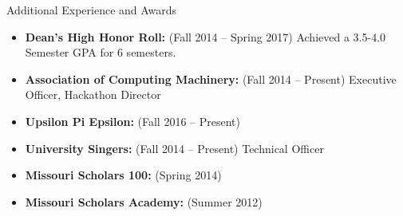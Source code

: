 \documentclass[]{mcdowellcv}
\begin{document}
    \begin{cvsection}{Additional Experience and Awards}
        \begin{cvsubsection}{}{}{}	
            \begin{itemize}
                \item \textbf{Dean's High Honor Roll:}  (Fall 2014 -- Spring 2017) Achieved a 3.5-4.0 Semester GPA for 6 semesters.
                \item \textbf{Association of Computing Machinery:} (Fall 2014 -- Present) Executive Officer, Hackathon Director
                \item \textbf{Upsilon Pi Epsilon:}  (Fall 2016 -- Present)
                \item \textbf{University Singers:} (Fall 2014 -- Present) Technical Officer
                \item \textbf{Missouri Scholars 100:} (Spring 2014)
                \item \textbf{Missouri Scholars Academy:} (Summer 2012)
            \end{itemize}
        \end{cvsubsection}
    \end{cvsection}
\end{document}
